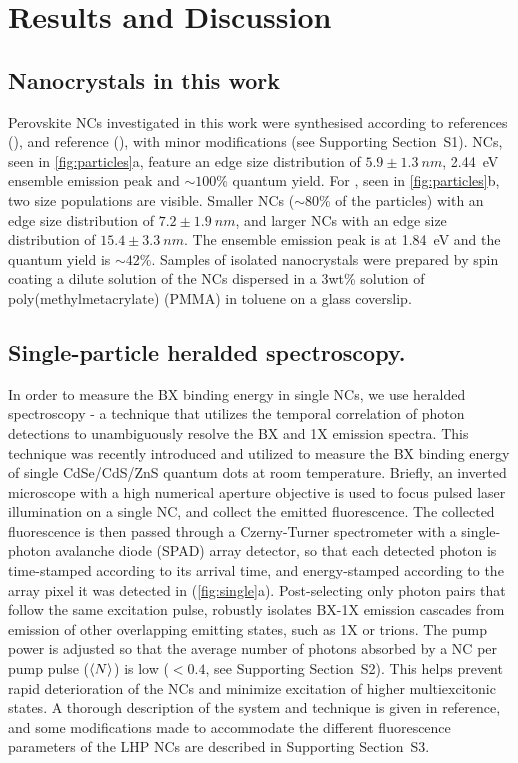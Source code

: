 \documentclass[journal=nalefd, manuscript=letter, layout=twocolumn]{achemso}
\newcommand{\supp}[1]{Supporting Section~S#1}
\begin{document}
\section*{Results and Discussion}

\subsection*{Nanocrystals in this work}
Perovskite NCs investigated in this work were synthesised according to references\cite{Cao2020,Ahmed2018} (), and reference\cite{Pan2020} (), with minor modifications (see \supp{1}).  NCs, seen in \autoref{fig:particles}a, feature an edge size distribution of $5.9\pm\SI{1.3}{nm}$, \SI{2.44}{eV} ensemble emission peak and ${\sim}100\%$ quantum yield. For , seen in \autoref{fig:particles}b, two size populations are visible. Smaller NCs (${\sim}80\%$ of the particles) with an edge size distribution of $7.2\pm\SI{1.9}{nm}$, and larger NCs with an edge size distribution of $15.4\pm\SI{3.3}{nm}$. The ensemble emission peak is at \SI{1.84}{eV} and the quantum yield is ${\sim}42\%$. Samples of isolated nanocrystals were prepared by spin coating a dilute solution of the NCs dispersed in a 3wt\% solution of poly(methylmetacrylate) (PMMA) in toluene on a glass coverslip.

\subsection*{Single-particle heralded spectroscopy.}
In order to measure the BX binding energy in single NCs, we use heralded spectroscopy - a technique that utilizes the temporal correlation of photon detections to unambiguously resolve the BX and 1X emission spectra. 
This technique was recently introduced and utilized to measure the BX binding energy of single CdSe/CdS/ZnS quantum dots at room temperature\cite{Lubin2021}. Briefly, an inverted microscope with a high numerical aperture objective is used to focus pulsed laser illumination on a single NC, and collect the emitted fluorescence. The collected fluorescence is then passed through a Czerny-Turner spectrometer with a single-photon avalanche diode (SPAD) array detector, so that each detected photon is time-stamped according to its arrival time, and energy-stamped according to the array pixel it was detected in (\autoref{fig:single}a). Post-selecting only photon pairs that follow the same excitation pulse, robustly isolates BX-1X emission cascades from emission of other overlapping emitting states, such as 1X or trions. The pump power is adjusted so that the average number of photons absorbed by a NC per pump pulse ($\ev{N}$) is low ($<0.4$, see \supp{2}). This helps prevent rapid deterioration of the NCs and minimize excitation of higher multiexcitonic states. A thorough description of the system and technique is given in reference\cite{Lubin2021}, and some modifications made to accommodate the different fluorescence parameters of the LHP NCs are described in \supp{3}.
\end{document}
